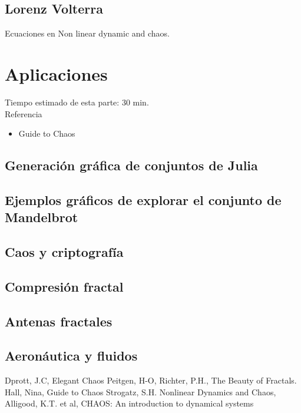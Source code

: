 \subsection{Lorenz Volterra}
Ecuaciones en Non linear dynamic and chaos.


\section{Aplicaciones}
Tiempo estimado de esta parte: 30 min.\\
Referencia
\begin{itemize}
\item Guide to Chaos
\end{itemize}
\subsection{Generación gráfica de conjuntos de Julia}
\subsection{Ejemplos gráficos de explorar el conjunto de Mandelbrot}
\subsection{Caos y criptografía}
\subsection{Compresión fractal}
\subsection{Antenas fractales}
\subsection{Aeronáutica y fluidos}

\newpage

\begin{thebibliography}{1}
Dprott, J.C, Elegant Chaos
Peitgen, H-O, Richter, P.H., The Beauty of Fractals.
Hall, Nina, Guide to Chaos
Strogatz, S.H. Nonlinear Dynamics and Chaos,
Alligood, K.T. et al, CHAOS: An introduction to dynamical systems
\end{thebibliography}

